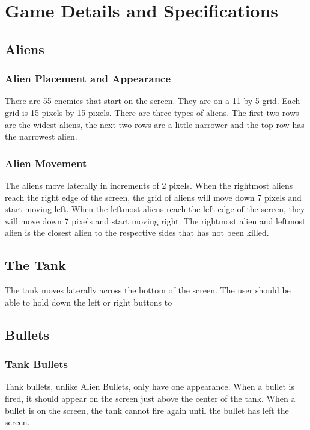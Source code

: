 \documentclass[11pt,letter,oneside]{report}
\begin{document}
\section{Game Details and Specifications}

\subsection{Aliens}

\subsubsection{Alien Placement and Appearance}
There are 55 enemies that start on the screen.  They are on a 11 by 5 grid.  Each grid is 15 pixels by 15 pixels.  There are three types of aliens.  The first two rows are the widest aliens, the next two rows are a little narrower and the top row has the narrowest alien.

\subsubsection{Alien Movement}
The aliens move laterally in increments of 2 pixels.  When the rightmost aliens reach the right edge of the screen, the grid of aliens will move down 7 pixels and start moving left.  When the leftmost aliens reach the left edge of the screen, they will move down 7 pixels and start moving right.  The rightmost alien and leftmost alien is the closest alien to the respective sides that has not been killed.

\subsection{The Tank}
The tank moves laterally across the bottom of the screen.  The user should be able to hold down the left or right buttons to 

\subsection{Bullets}
\subsubsection{Tank Bullets}
Tank bullets, unlike Alien Bullets, only have one appearance.  When a bullet is fired, it should appear on the screen just above the center of the tank.  When a bullet is on the screen, the tank cannot fire again until the bullet has left the screen.
\end{document}
